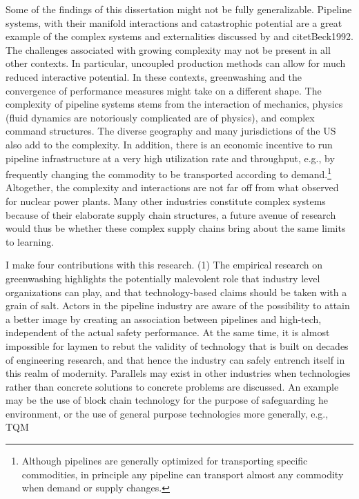 Some of the findings of this dissertation might not be fully generalizable. Pipeline systems, with their manifold interactions and catastrophic potential are a great example of the complex systems and externalities discussed by \citet{Perrow1984} and citet{Beck1992}. The challenges associated with growing complexity may not be present in all other contexts. In particular, uncoupled production methods can allow for much reduced interactive potential. In these contexts, greenwashing and the convergence of performance measures might take on a different shape. The complexity of pipeline systems stems from the interaction of mechanics, physics (fluid dynamics are notoriously complicated are of physics), and complex command structures. The diverse geography and many jurisdictions of the US also add to the complexity. In addition, there is an economic incentive to run pipeline infrastructure at a very high utilization rate and throughput, e.g., by frequently changing the commodity to be transported according to demand.\footnote{Although pipelines are generally optimized for transporting specific commodities, in principle any pipeline can transport almost any commodity when demand or supply changes.} Altogether, the complexity and interactions are not far off from what \citet{Perrow1984} observed for nuclear power plants. Many other industries constitute complex systems because of their elaborate supply chain structures, a future avenue of research would thus be whether these complex supply chains bring about the same limits to learning.

I make four contributions with this research. (1) The empirical research on greenwashing highlights the potentially malevolent role that industry level organizations can play, and that technology-based claims should be taken with a grain of salt. Actors in the pipeline industry are aware of the possibility to attain a better image by creating an association between pipelines and high-tech, independent of the actual safety performance. At the same time, it is almost impossible for laymen to rebut the validity of technology that is built on decades of engineering research, and that hence the industry can safely entrench itself in this realm of modernity. Parallels may exist in other industries when technologies rather than concrete solutions to concrete problems are discussed. An example may be the use of block chain technology for the purpose of safeguarding he environment, or the use of general purpose technologies more generally, e.g., TQM \citep{Zbaracki1994}

